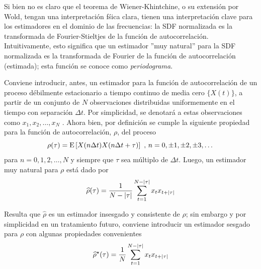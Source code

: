 Si bien no es claro que el teorema de Wiener-Khintchine, o su extensi\'on por Wold, tengan una
interpretaci\'on f\'sica clara, tienen una interpretaci\'on clave para los estimadores en el
dominio de las frecuencias:
la SDF normalizada es la transformada de Fourier-Stieltjes de la 
funci\'on de autocorrelaci\'on.
Intuitivamente, esto significa que un estimador ''muy natural'' para la SDF normalizada
es la transformada de Fourier de la funci\'on de autocorrelaci\'on (estimada);
esta funci\'on se conoce como \textit{periodograma}.

Conviene introducir, antes, un estimador para la funci\'on de autocorrelaci\'on de un proceso
d\'ebilmente estacionario a tiempo continuo de media cero $\{ X(t) \}$, 
a partir de un conjunto de $N$ 
observaciones distribuidas uniformemente en el tiempo con separaci\'on $\Delta t$.
Por simplicidad, se denotar\'a a estas observaciones como $x_1, x_2 , \dots, x_N$ .
Ahora bien, 
por definici\'on se cumple la siguiente propiedad para la funci\'on de autocorrelaci\'on, $\rho$,
del proceso
\begin{equation*}
\rho(\tau)
= \mathrm{E}\left[ X(n\Delta t)X(n\Delta t + \tau) \right] \text{  ,  } n = 0,\pm 1,\pm 2, \pm 3,\dots
\end{equation*}
para $n = 0, 1, 2, \dots, N$ y siempre que $\tau$ sea m\'ultiplo de
$\Delta t$. Luego, un estimador muy natural para $\rho$ est\'a dado por
\begin{equation}
\widehat{\rho}(\tau) = \frac{1}{N-\left| \tau \right|} 
\sum_{t = 1}^{N-\left| \tau \right|} x_t x_{t+\left| \tau \right|}
\label{estimador_R}
\end{equation}

Resulta que $\widehat{\rho}$ es un estimador insesgado y consistente de $\rho$;
sin embargo y por simplicidad en un tratamiento futuro, 
conviene introducir un estimador sesgado para $\rho$ con algunas propiedades convenientes
\begin{equation}
\widehat{ \rho }^{\star}(\tau) = \frac{1}{N} 
\sum_{t = 1}^{N-\left| \tau \right|} x_t x_{t+\left| \tau \right|}
\label{estimador_R_ast}
\end{equation}

